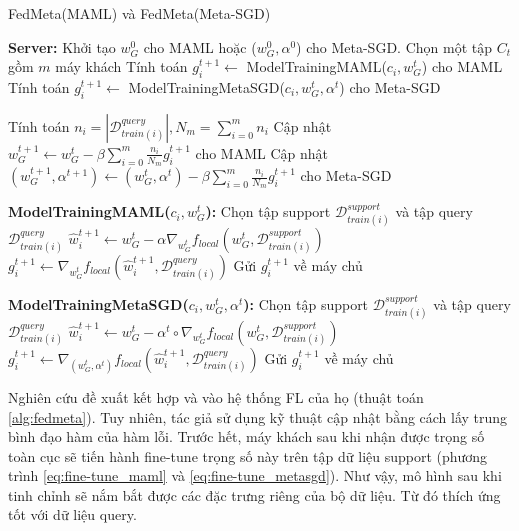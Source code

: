 \begin{algorithm}[H]
    \caption{FedMeta(MAML) và FedMeta(Meta-SGD) \cite{chen2018federated}} \label{alg:fedmeta}
    \begin{algorithmic}[1]
        \State \textbf{Server:}
        \State Khởi tạo $w_G^0$ cho MAML hoặc ($w_G^0, \alpha^0$) cho Meta-SGD.
            \State Chọn một tập $C_t$ gồm $m$ máy khách
                \State Tính toán $g_i^{t+1} \gets$ ModelTrainingMAML($c_i, w_G^t$) cho MAML
                \State Tính toán $g_i^{t+1} \gets$ ModelTrainingMetaSGD($c_i, w_G^t, \alpha^t$) cho Meta-SGD
            \EndFor

            \State

            \State Tính toán {$n_i = \left| \mathcal{D}_{train(i)}^{query} \right|, N_m = \sum_{i=0}^m n_i$}
            \State Cập nhật $w_G^{t+1} \gets w_G^t - \beta \sum_{i=0}^m \frac{n_i}{N_m} g_i^{t+1}$ cho MAML
            \State Cập nhật $(w_G^{t+1}, \alpha^{t+1}) \gets (w_G^t, \alpha^t) - \beta \sum_{i=0}^m \frac{n_i}{N_m} g_i^{t+1}$ cho Meta-SGD
        \EndFor

        \Statex

        \State\textbf{ModelTrainingMAML($c_i, w_G^t$):} 
        \State Chọn tập support $\mathcal{D}_{train(i)}^{support}$ và tập query $\mathcal{D}_{train(i)}^{query}$
        \State $\hat{w}_i^{t+1} \gets w_G^t - \alpha\nabla_{w_G^t} f_{local}(w_G^t, \mathcal{D}_{train(i)}^{support})$
        \State $g_i^{t+1} \gets \nabla_{w_G^t} f_{local}(\hat{w}_i^{t+1}, \mathcal{D}_{train(i)}^{query})$
        \State Gửi $g_i^{t+1}$ về máy chủ

        \Statex

        \State\textbf{ModelTrainingMetaSGD($c_i, w_G^t, \alpha^t$):} 
        \State Chọn tập support $\mathcal{D}_{train(i)}^{support}$ và tập query $\mathcal{D}_{train(i)}^{query}$
        \State $\hat{w}_i^{t+1} \gets w_G^t - \alpha^t \circ \nabla_{w_G^t} f_{local}(w_G^t, \mathcal{D}_{train(i)}^{support})$
        \State $g_i^{t+1} \gets \nabla_{(w_G^t,\alpha^t)} f_{local}(\hat{w}_i^{t+1}, \mathcal{D}_{train(i)}^{query})$
        \State Gửi $g_i^{t+1}$ về máy chủ
    \end{algorithmic}
\end{algorithm}

Nghiên cứu \cite{chen2018federated} đề xuất kết hợp  và  vào hệ thống FL của họ (thuật toán \ref{alg:fedmeta}). Tuy nhiên, tác giả sử dụng kỹ thuật cập nhật bằng cách lấy trung bình đạo hàm của hàm lỗi. Trước hết, máy khách sau khi nhận được trọng số toàn cục sẽ tiến hành fine-tune trọng số này trên tập dữ liệu support (phương trình \ref{eq:fine-tune_maml} và \ref{eq:fine-tune_metasgd}). Như vậy, mô hình sau khi tinh chỉnh sẽ nắm bắt được các đặc trưng riêng của bộ dữ liệu. Từ đó thích ứng tốt với dữ liệu query.

